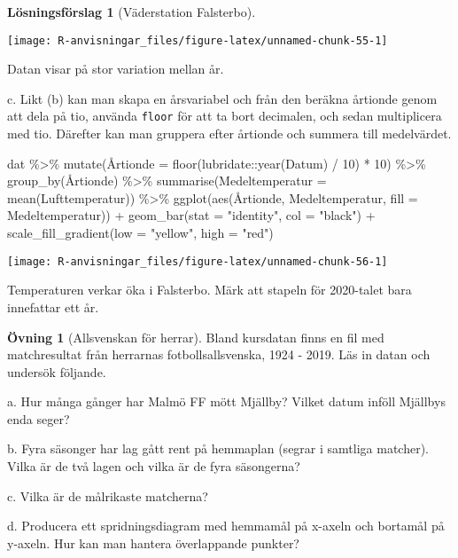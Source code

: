 \documentclass[
]{book}
\newenvironment{Shaded}{\begin{snugshade}}{\end{snugshade}}
\newcommand{\AttributeTok}[1]{\textcolor[rgb]{0.77,0.63,0.00}{#1}}
\newcommand{\DecValTok}[1]{\textcolor[rgb]{0.00,0.00,0.81}{#1}}
\newcommand{\FunctionTok}[1]{\textcolor[rgb]{0.00,0.00,0.00}{#1}}
\newcommand{\NormalTok}[1]{#1}
\newcommand{\SpecialCharTok}[1]{\textcolor[rgb]{0.00,0.00,0.00}{#1}}
\newcommand{\StringTok}[1]{\textcolor[rgb]{0.31,0.60,0.02}{#1}}
\theoremstyle{definition}
\theoremstyle{definition}
\theoremstyle{definition}
\newtheorem{exercise}{Övning}[chapter]
\theoremstyle{definition}
\newtheorem{hypothesis}{Lösningsförslag}[chapter]
\theoremstyle{remark}
\begin{document}
\begin{hypothesis}[Väderstation Falsterbo]
\begin{center}\texttt{[image: R-anvisningar\_files/figure-latex/unnamed-chunk-55-1]} \end{center}

Datan visar på stor variation mellan år.

c. Likt (b) kan man skapa en årsvariabel och från den beräkna årtionde genom att dela på tio, använda \texttt{floor} för att ta bort decimalen, och sedan multiplicera med tio. Därefter kan man gruppera efter årtionde och summera till medelvärdet.

\begin{Shaded}
\begin{Highlighting}[]
\NormalTok{dat }\SpecialCharTok{\%\textgreater{}\%} 
  \FunctionTok{mutate}\NormalTok{(Å}\AttributeTok{rtionde =} \FunctionTok{floor}\NormalTok{(lubridate}\SpecialCharTok{::}\FunctionTok{year}\NormalTok{(Datum) }\SpecialCharTok{/} \DecValTok{10}\NormalTok{) }\SpecialCharTok{*} \DecValTok{10}\NormalTok{) }\SpecialCharTok{\%\textgreater{}\%} 
  \FunctionTok{group\_by}\NormalTok{(Årtionde) }\SpecialCharTok{\%\textgreater{}\%} 
  \FunctionTok{summarise}\NormalTok{(}\AttributeTok{Medeltemperatur =} \FunctionTok{mean}\NormalTok{(Lufttemperatur)) }\SpecialCharTok{\%\textgreater{}\%} 
  \FunctionTok{ggplot}\NormalTok{(}\FunctionTok{aes}\NormalTok{(Årtionde, Medeltemperatur, }\AttributeTok{fill =}\NormalTok{ Medeltemperatur)) }\SpecialCharTok{+}
  \FunctionTok{geom\_bar}\NormalTok{(}\AttributeTok{stat =} \StringTok{"identity"}\NormalTok{, }\AttributeTok{col =} \StringTok{"black"}\NormalTok{) }\SpecialCharTok{+}
  \FunctionTok{scale\_fill\_gradient}\NormalTok{(}\AttributeTok{low =} \StringTok{"yellow"}\NormalTok{, }\AttributeTok{high =} \StringTok{"red"}\NormalTok{)}
\end{Highlighting}
\end{Shaded}

\begin{center}\texttt{[image: R-anvisningar\_files/figure-latex/unnamed-chunk-56-1]} \end{center}

Temperaturen verkar öka i Falsterbo. Märk att stapeln för 2020-talet bara innefattar ett år.
\end{hypothesis}

\begin{exercise}[Allsvenskan för herrar]
Bland kursdatan finns en fil med matchresultat från herrarnas fotbollsallsvenska, 1924 - 2019. Läs in datan och undersök följande.

a. Hur många gånger har Malmö FF mött Mjällby? Vilket datum inföll Mjällbys enda seger?

b. Fyra säsonger har lag gått rent på hemmaplan (segrar i samtliga matcher). Vilka är de två lagen och vilka är de fyra säsongerna?

c. Vilka är de målrikaste matcherna?

d. Producera ett spridningsdiagram med hemmamål på x-axeln och bortamål på y-axeln. Hur kan man hantera överlappande punkter?
\end{exercise}
\end{document}
